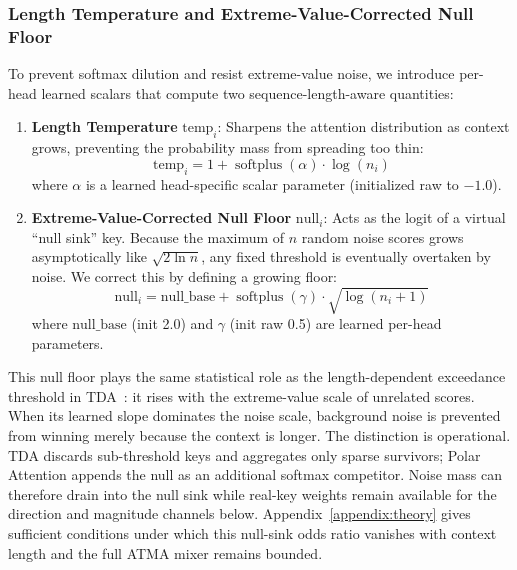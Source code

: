 \documentclass{article} %
\begin{document}
\subsubsection{Length Temperature and Extreme-Value-Corrected Null Floor}
To prevent softmax dilution and resist extreme-value noise, we introduce per-head learned scalars that compute two sequence-length-aware quantities:
\begin{enumerate}
    \item \textbf{Length Temperature} $\mathrm{temp}_i$: Sharpens the attention distribution as context grows, preventing the probability mass from spreading too thin:
    \begin{equation}
        \mathrm{temp}_i = 1 + \operatorname{softplus}(\alpha) \cdot \log(n_i)
    \end{equation}
    where $\alpha$ is a learned head-specific scalar parameter (initialized raw to $-1.0$).
    \item \textbf{Extreme-Value-Corrected Null Floor} $\mathrm{null}_i$: Acts as the logit of a virtual ``null sink'' key. Because the maximum of $n$ random noise scores grows asymptotically like $\sqrt{2 \ln n}$, any fixed threshold is eventually overtaken by noise. We correct this by defining a growing floor:
    \begin{equation}
        \mathrm{null}_i = \text{null\_base} + \operatorname{softplus}(\gamma) \cdot \sqrt{\log(n_i + 1)}
    \end{equation}
    where $\text{null\_base}$ (init 2.0) and $\gamma$ (init raw 0.5) are learned per-head parameters.
\end{enumerate}
This null floor plays the same statistical role as the length-dependent exceedance threshold in TDA~\citep{huang2026threshold}: it rises with the extreme-value scale of unrelated scores. When its learned slope dominates the noise scale, background noise is prevented from winning merely because the context is longer. The distinction is operational. TDA discards sub-threshold keys and aggregates only sparse survivors; Polar Attention appends the null as an additional softmax competitor. Noise mass can therefore drain into the null sink while real-key weights remain available for the direction and magnitude channels below. Appendix~\ref{appendix:theory} gives sufficient conditions under which this null-sink odds ratio vanishes with context length and the full ATMA mixer remains bounded.
\end{document}
